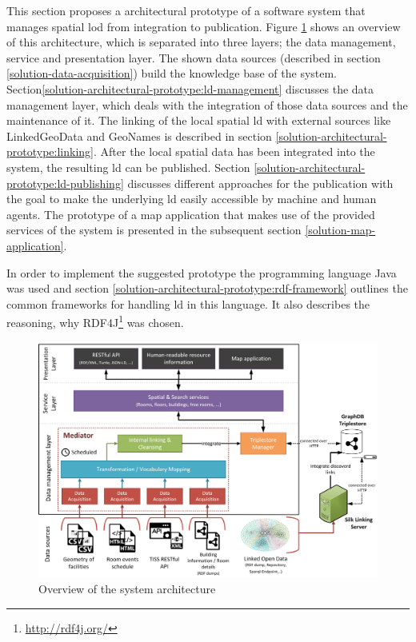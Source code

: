 \documentclass[draft,final]{vutinfth} %
\begin{document}
This section proposes a architectural prototype of a software system that manages spatial \gls{lod} from integration to publication. Figure \ref{fig:solution-architectural-prototype} shows an overview of this architecture, which is separated into three layers; the data management, service and presentation layer. The shown data sources (described in section \ref{solution-data-acquisition}) build the knowledge base of the system. Section\ref{solution-architectural-prototype:ld-management} discusses the data management layer, which deals with the integration of those data sources and the maintenance of it. The linking of the local spatial \gls{ld} with external sources like LinkedGeoData and GeoNames is described in section \ref{solution-architectural-prototype:linking}. After the local spatial data has been integrated into the system, the resulting \gls{ld} can be published. Section \ref{solution-architectural-prototype:ld-publishing} discusses different approaches for the publication with the goal to make the underlying \gls{ld} easily accessible by machine and human agents. The prototype of a map application that makes use of the provided services of the system is presented in the subsequent section \ref{solution-map-application}.   

In order to implement the suggested prototype the programming language Java was used and section \ref{solution-architectural-prototype:rdf-framework} outlines the common frameworks for handling \gls{ld} in this language. It also describes the reasoning, why RDF4J\footnote{\url{http://rdf4j.org/}} was chosen.

\begin{figure}[h]
    \centering
    \includegraphics[width=1.0\textwidth]{graphics/finderArchitecture.png}
    \caption{Overview of the system architecture}
    \label{fig:solution-architectural-prototype}
\end{figure}
\end{document}
